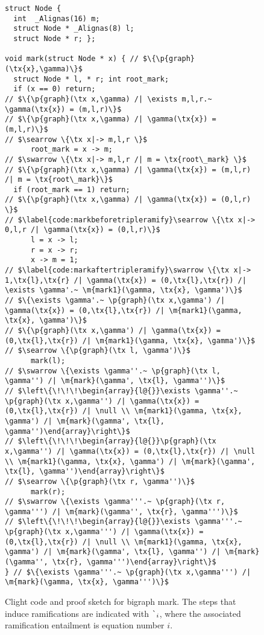 \begin{figure}[t]
  \begin{lstlisting}
struct Node {
  int  _Alignas(16) m;
  struct Node * _Alignas(8) l;
  struct Node * r; };

void mark(struct Node * x) { // $\{\p{graph}(\tx{x},\gamma)\}$
  struct Node * l, * r; int root_mark;
  if (x == 0) return;
// $\{\p{graph}(\tx x,\gamma) /| \exists m,l,r.~ \gamma(\tx{x}) = (m,l,r)\}$
// $\{\p{graph}(\tx x,\gamma) /| \gamma(\tx{x}) = (m,l,r)\}$
// $\searrow \{\tx x|-> m,l,r \}$
      root_mark = x -> m;
// $\swarrow \{\tx x|-> m,l,r /| m = \tx{root\_mark} \}$
// $\{\p{graph}(\tx x,\gamma) /| \gamma(\tx{x}) = (m,l,r) /| m = \tx{root\_mark}\}$
  if (root_mark == 1) return;
// $\{\p{graph}(\tx x,\gamma) /| \gamma(\tx{x}) = (0,l,r) \}$
// $\label{code:markbeforetripleramify}\searrow \{\tx x|-> 0,l,r /| \gamma(\tx{x}) = (0,l,r)\}$
      l = x -> l;
      r = x -> r;
      x -> m = 1;
// $\label{code:markaftertripleramify}\swarrow \{\tx x|-> 1,\tx{l},\tx{r} /| \gamma(\tx{x}) = (0,\tx{l},\tx{r}) /| \exists \gamma'.~ \m{mark1}(\gamma, \tx{x}, \gamma')\}$
// $\{\exists \gamma'.~ \p{graph}(\tx x,\gamma') /| \gamma(\tx{x}) = (0,\tx{l},\tx{r}) /| \m{mark1}(\gamma, \tx{x}, \gamma')\}$
// $\{\p{graph}(\tx x,\gamma') /| \gamma(\tx{x}) = (0,\tx{l},\tx{r}) /| \m{mark1}(\gamma, \tx{x}, \gamma')\}$
// $\searrow \{\p{graph}(\tx l, \gamma')\}$
      mark(l);
// $\swarrow \{\exists \gamma''.~ \p{graph}(\tx l, \gamma'') /| \m{mark}(\gamma', \tx{l}, \gamma'')\}$
// $\left\{\!\!\!\begin{array}{l@{}}\exists \gamma''.~ \p{graph}(\tx x,\gamma'') /| \gamma(\tx{x}) = (0,\tx{l},\tx{r}) /| \null \\ \m{mark1}(\gamma, \tx{x}, \gamma') /| \m{mark}(\gamma', \tx{l}, \gamma'')\end{array}\right\}$
// $\left\{\!\!\!\begin{array}{l@{}}\p{graph}(\tx x,\gamma'') /| \gamma(\tx{x}) = (0,\tx{l},\tx{r}) /| \null \\ \m{mark1}(\gamma, \tx{x}, \gamma') /| \m{mark}(\gamma', \tx{l}, \gamma'')\end{array}\right\}$
// $\searrow \{\p{graph}(\tx r, \gamma'')\}$
      mark(r);
// $\swarrow \{\exists \gamma'''.~ \p{graph}(\tx r, \gamma''') /| \m{mark}(\gamma'', \tx{r}, \gamma''')\}$
// $\left\{\!\!\!\begin{array}{l@{}}\exists \gamma'''.~ \p{graph}(\tx x,\gamma''') /| \gamma(\tx{x}) = (0,\tx{l},\tx{r}) /| \null \\ \m{mark1}(\gamma, \tx{x}, \gamma') /| \m{mark}(\gamma', \tx{l}, \gamma'') /| \m{mark}(\gamma'', \tx{r}, \gamma''')\end{array}\right\}$
} // $\{\exists \gamma'''.~ \p{graph}(\tx x,\gamma''') /| \m{mark}(\gamma, \tx{x}, \gamma''')\}$
\end{lstlisting}
\caption{Clight code and proof sketch for bigraph mark. {\color{magenta} The steps that induce
  ramifications are indicated with $\lightning_i$, where the associated ramification entailment is equation number $i$.}} %
\label{fig:markgraph}
\end{figure}
